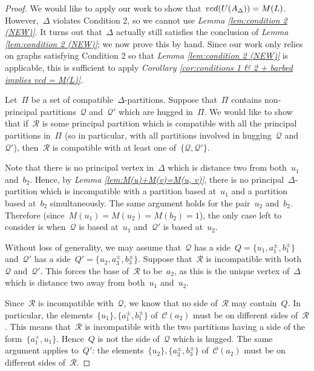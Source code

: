 \documentclass[11pt]{amsart}
\theoremstyle{definition}
\theoremstyle{definition}
\theoremstyle{definition}
\theoremstyle{definition}
\newcommand{\calC}{\mathcal{C}}
\newcommand{\calQ}{\mathcal{Q}}
\newcommand{\calR}{\mathcal{R}} %
\begin{document}
\begin{proof}
    We would like to apply our work to show that~$\textsc{vcd}(U(A_\Delta)) = M(L)$. However,~$\Delta$ violates Condition 2, so we cannot use \emph{Lemma \ref{lem:condition 2 (NEW)}}. It turns out that~$\Delta$ actually still satisfies the conclusion of \emph{Lemma \ref{lem:condition 2 (NEW)}}; we now prove this by hand. Since our work only relies on graphs satisfying Condition 2 so that \emph{Lemma \ref{lem:condition 2 (NEW)}} is applicable, this is sufficient to apply \emph{Corollary \ref{cor:conditions 1 & 2 + barbed implies vcd = M(L)}}.

    Let~$\Pi$ be a set of compatible~$\Delta$-partitions. Suppose that~$\Pi$ contains non-principal partitions~$\calQ$ and~$\calQ'$ which are hugged in~$\Pi$. We would like to show that if~$\calR$ is some principal partition which is compatible with all the principal partitions in~$\Pi$ (so in particular, with all partitions involved in hugging~$\calQ$ and~$\calQ'$), then~$\calR$ is compatible with at least one of~$\{\calQ, \calQ'\}$. 

    Note that there is no principal vertex in~$\Delta$ which is distance two from both~$u_1$ and~$b_2$. Hence, by \emph{Lemma \ref{lem:M(u)+M(v)=M(u, v)}}, there is no principal~$\Delta$-partition which is incompatible with a partition based at~$u_1$ and a partition based at~$b_2$ simultaneously. The same argument holds for the pair~$u_2$ and~$b_2$. Therefore (since~$M(u_1) = M(u_2) = M(b_2) = 1$), the only case left to consider is when~$\calQ$ is based at~$u_1$ and~$\calQ'$ is based at~$u_2$. 

    Without loss of generality, we may assume that~$\calQ$ has a side~$Q = \{u_1, a_1^\pm, b_1^\pm\}$ and~$\calQ'$ has a side~$Q' = \{u_2, a_3^\pm, b_3^\pm\}$. Suppose that~$\calR$ is incompatible with both~$\calQ$ and~$\calQ'$. This forces the base of~$\calR$ to be~$a_2$, as this is the unique vertex of~$\Delta$ which is distance two away from both~$u_1$ and~$u_2$. 

    Since~$\calR$ is incompatible with~$\calQ$, we know that no side of~$\calR$ may contain~$Q$. In particular, the elements~$\{u_1\}, \{a_1^\pm, b_1^\pm\}$ of~$\calC(a_2)$ must be on different sides of~$\calR$. This means that~$\calR$ is incompatible with the two partitions having a side of the form~$\{a_1^\times, u_1\}$. Hence~$Q$ is not the side of~$\calQ$ which is hugged. The same argument applies to~$Q'$: the elements~$\{u_2\}, \{a_3^\pm, b_3^\pm\}$ of~$\calC(a_2)$ must be on different sides of~$\calR$. 


\end{proof}
\end{document}
